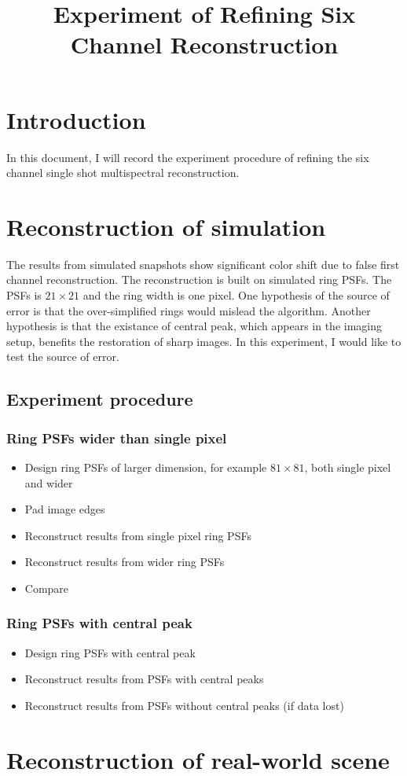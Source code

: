 \documentclass[12pt]{article}
\title{Experiment of Refining Six Channel Reconstruction}
\begin{document}
\maketitle
\section{Introduction}
In this document, I will record the experiment procedure of refining the six channel single shot multispectral reconstruction.
\section{Reconstruction of simulation}
The results from simulated snapshots show significant color shift due to false first channel reconstruction. The reconstruction is built on simulated ring PSFs. The PSFs is $21\times 21$ and the ring width is one pixel. One hypothesis of the source of error is that the over-simplified rings would mislead the algorithm. Another hypothesis is that the existance of central peak, which appears in the imaging setup, benefits the restoration of sharp images. In this experiment, I would like to test the source of error. 
\subsection{Experiment procedure}
\subsubsection{Ring PSFs wider than single pixel}
\begin{itemize}
\item Design ring PSFs of larger dimension, for example $81\times 81$, both single pixel and wider
\item Pad image edges
\item Reconstruct results from single pixel ring PSFs
\item Reconstruct results from wider ring PSFs 
\item Compare
\end{itemize}
\subsubsection{Ring PSFs with central peak}
\begin{itemize}
\item Design ring PSFs with central peak
\item Reconstruct results from PSFs with central peaks
\item Reconstruct results from PSFs without central peaks (if data lost)
\end{itemize}
\section{Reconstruction of real-world scene}
\end{document}
